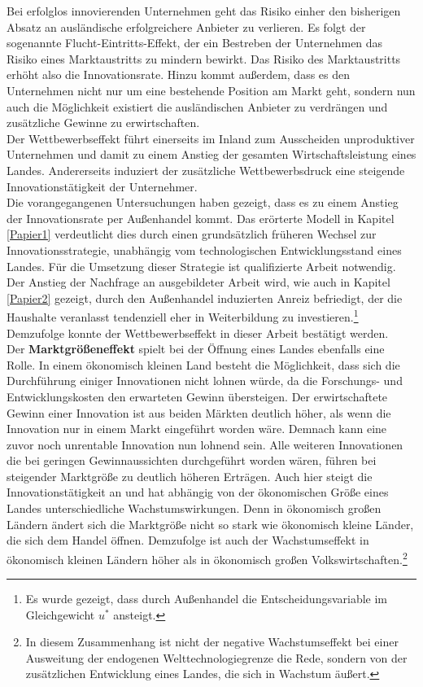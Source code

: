 %
Bei erfolglos innovierenden Unternehmen geht das Risiko einher den bisherigen Absatz an ausländische erfolgreichere Anbieter zu verlieren. Es folgt der sogenannte Flucht-Eintritts-Effekt, der ein Bestreben der Unternehmen das Risiko eines Marktaustritts zu mindern bewirkt. Das Risiko des Marktaustritts erhöht also die Innovationsrate. Hinzu kommt außerdem, dass es den Unternehmen nicht nur um eine bestehende Position am Markt geht, sondern nun auch die Möglichkeit existiert die ausländischen Anbieter zu verdrängen und zusätzliche Gewinne zu erwirtschaften. \\
%
Der Wettbewerbseffekt führt einerseits im Inland zum Ausscheiden unproduktiver Unternehmen und damit zu einem Anstieg der gesamten Wirtschaftsleistung eines Landes. Andererseits induziert der zusätzliche Wettbewerbsdruck eine steigende Innovationstätigkeit der Unternehmer. \\ 
%
Die vorangegangenen Untersuchungen haben gezeigt, dass es zu einem Anstieg der Innovationsrate per Außenhandel kommt. Das erörterte Modell in Kapitel \ref{Papier1} verdeutlicht dies durch einen grundsätzlich früheren Wechsel zur Innovationsstrategie, unabhängig vom technologischen Entwicklungsstand eines Landes. Für die Umsetzung dieser Strategie ist qualifizierte Arbeit notwendig. Der Anstieg der Nachfrage an ausgebildeter Arbeit wird, wie auch in Kapitel \ref{Papier2} gezeigt, durch den Außenhandel induzierten Anreiz befriedigt, der die Haushalte veranlasst tendenziell eher in Weiterbildung zu investieren.\footnote{Es wurde gezeigt, dass durch Außenhandel die Entscheidungsvariable im Gleichgewicht $u^*$ ansteigt.} Demzufolge konnte der Wettbewerbseffekt in dieser Arbeit bestätigt werden. \\
%
Der \textbf{Marktgrößeneffekt} spielt bei der Öffnung eines Landes ebenfalls eine Rolle. In einem ökonomisch kleinen Land besteht die Möglichkeit, dass sich die Durchführung einiger Innovationen nicht lohnen würde, da die Forschungs- und Entwicklungskosten den erwarteten Gewinn übersteigen. Der erwirtschaftete Gewinn einer Innovation ist aus beiden Märkten  deutlich höher, als wenn die Innovation nur in einem Markt eingeführt worden wäre. Demnach kann eine zuvor noch unrentable Innovation nun lohnend sein. Alle weiteren Innovationen die bei geringen Gewinnaussichten durchgeführt worden wären, führen bei steigender Marktgröße zu deutlich höheren Erträgen.
Auch hier steigt die Innovationstätigkeit an und hat abhängig von der ökonomischen Größe eines Landes unterschiedliche Wachstumswirkungen. Denn in ökonomisch großen Ländern ändert sich die Marktgröße nicht so stark wie ökonomisch kleine Länder, die sich dem Handel öffnen. Demzufolge ist auch der Wachstumseffekt in ökonomisch kleinen Ländern höher als in ökonomisch großen Volkswirtschaften.\footnote{In diesem Zusammenhang ist nicht der negative Wachstumseffekt bei einer Ausweitung der endogenen Welttechnologiegrenze die Rede, sondern von der zusätzlichen Entwicklung eines Landes, die sich in Wachstum äußert.}\\
